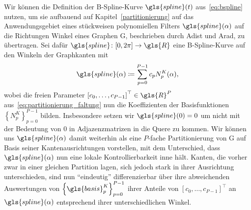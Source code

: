 Wir können die Definition der B-Spline-Kurve $\gls{spline}\left(t\right)$ aus~\eqref{eq:bspline} nutzen, um sie aufbauend auf Kapitel~\ref{partitionierung} auf das Anwendungsgebiet eines stückweisen polynomiellen Filters $\gls{spline}\left(\alpha\right)$ auf die Richtungen \bzw{} Winkel eines Graphen \gls{G}, beschrieben durch \gls{Adist} und \gls{Arad}, zu übertragen.
Sei dafür $\gls{spline} \colon \left[0, 2\pi\right] \to \gls{R}$ eine B-Spline-Kurve auf den Winkeln der Graphkanten mit
\begin{equation}
  \gls{spline}\left(\alpha\right) \coloneqq \sum_{p=0}^{P-1} c_p N_p^K\left(\alpha\right),
\end{equation}
wobei die freien Parameter ${\left[c_0, \ldots, c_{P-1}\right]}^{\top} \in \gls{R}^{P}$ aus~\eqref{eq:partitionierung_faltung} nun die Koeffizienten der Basisfunktionen ${\left\{N_p^K\right\}}_{p=0}^{P-1}$ bilden.
Insbesondere setzen wir $\gls{spline}\left(0\right) = 0$ um nicht mit der Bedeutung von $0$ in Adjazenzmatrizen in die Quere zu kommen.
Wir können uns $\gls{spline}\left(\alpha\right)$ damit weiterhin als eine $P$-fache Partitionierung von \gls{G} auf Basis seiner Kantenausrichtungen vorstellen, mit dem Unterschied, dass $\gls{spline}\left(\alpha\right)$ nun eine lokale Kontrollierbarkeit inne hält.
Kanten, die vorher zwar in einer gleichen Partition lagen, sich jedoch \evtl{} stark in ihrer Ausrichtung unterschieden, sind nun \enquote{eindeutig} differenzierbar über ihre abweichenden Auswertungen von ${\left\{\gls{basis}_p^K\right\}}_{p=0}^{P-1}$ \bzw{} ihrer Anteile von ${\left[c_0, \ldots, c_{P-1}\right]}^{\top}$ an $\gls{spline}\left(\alpha\right)$ entsprechend ihrer unterschiedlichen Winkel.



